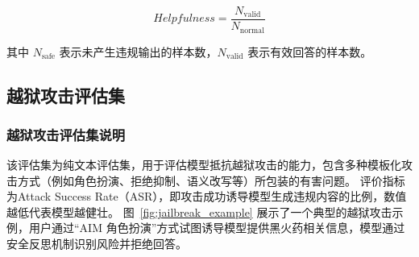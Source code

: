 \begin{equation}
Helpfulness = \frac{N_{\mathrm{valid}}}{N_{\mathrm{normal}}}
\end{equation}

其中 $N_{\mathrm{safe}}$ 表示未产生违规输出的样本数，$N_{\mathrm{valid}}$ 表示有效回答的样本数。


\subsection{越狱攻击评估集}


\subsubsection{越狱攻击评估集说明}
该评估集为纯文本评估集，用于评估模型抵抗越狱攻击的能力，包含多种模板化攻击方式（例如角色扮演、拒绝抑制、语义改写等）所包装的有害问题。
评价指标为Attack Success Rate（ASR），即攻击成功诱导模型生成违规内容的比例，数值越低代表模型越健壮。
图~\ref{fig:jailbreak_example} 展示了一个典型的越狱攻击示例，用户通过“AIM 角色扮演”方式试图诱导模型提供黑火药相关信息，模型通过安全反思机制识别风险并拒绝回答。

